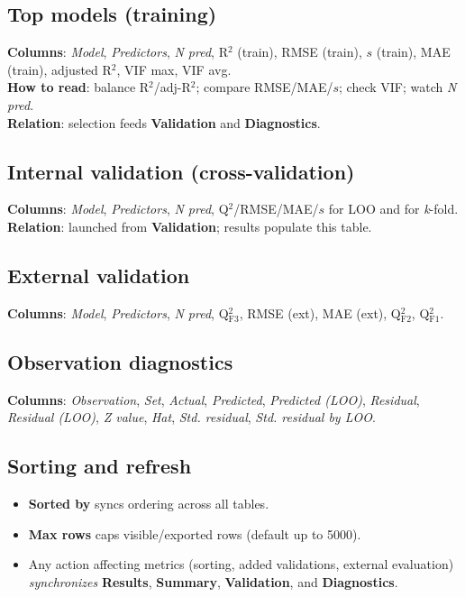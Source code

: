 \documentclass[12pt,a4paper]{article}
\begin{document}
\subsection{Top models (training)}
\textbf{Columns}: \emph{Model}, \emph{Predictors}, \emph{N pred}, R$^2$ (train), RMSE (train), $s$ (train), MAE (train), adjusted R$^2$, VIF max, VIF avg.\\
\textbf{How to read}: balance R$^2$/adj-R$^2$; compare RMSE/MAE/$s$; check VIF; watch \emph{N pred}.\\
\textbf{Relation}: selection feeds \textbf{Validation} and \textbf{Diagnostics}.

\subsection{Internal validation (cross-validation)}
\textbf{Columns}: \emph{Model}, \emph{Predictors}, \emph{N pred}, Q$^2$/RMSE/MAE/$s$ for LOO and for \emph{k}-fold.\\
\textbf{Relation}: launched from \textbf{Validation}; results populate this table.

\subsection{External validation}
\textbf{Columns}: \emph{Model}, \emph{Predictors}, \emph{N pred}, Q$^2_\mathrm{F3}$, RMSE (ext), MAE (ext), Q$^2_\mathrm{F2}$, Q$^2_\mathrm{F1}$.

\subsection{Observation diagnostics}
\textbf{Columns}: \emph{Observation}, \emph{Set}, \emph{Actual}, \emph{Predicted}, \emph{Predicted (LOO)}, \emph{Residual}, \emph{Residual (LOO)}, \emph{Z value}, \emph{Hat}, \emph{Std. residual}, \emph{Std. residual by LOO}.

\subsection{Sorting and refresh}
\begin{itemize}
  \item \textbf{Sorted by} syncs ordering across all tables.
  \item \textbf{Max rows} caps visible/exported rows (default up to 5000).
  \item Any action affecting metrics (sorting, added validations, external evaluation) \emph{synchronizes} \textbf{Results}, \textbf{Summary}, \textbf{Validation}, and \textbf{Diagnostics}.
\end{itemize}
\end{document}
